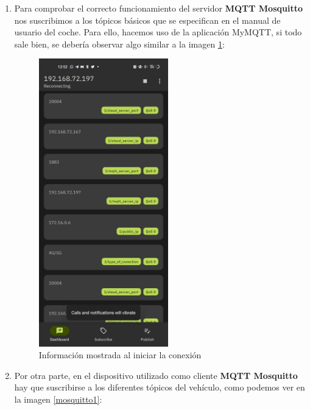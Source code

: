 \begin{enumerate}
\item Para comprobar el correcto funcionamiento del servidor \textbf{MQTT Mosquitto} nos  suscribimos a los tópicos básicos que se especifican en el manual de usuario del coche. Para ello, hacemos uso de la aplicación MyMQTT, si todo sale bien, se debería observar algo similar a la imagen \ref{mosquitto3}:

 \begin{figure}[H]
    \centering
    \includegraphics[width=0.53\textwidth]{Imagenes/Rendimiento/mosquitto3.jpeg}
    \caption{Información mostrada al iniciar la conexión}
    \label{mosquitto3}
\end{figure}

\item Por otra parte, en el dispositivo utilizado como cliente \textbf{MQTT Mosquitto} hay que suscribirse a los diferentes tópicos del vehículo, como podemos ver en la imagen \ref{mosquitto1}:


\end{enumerate}
